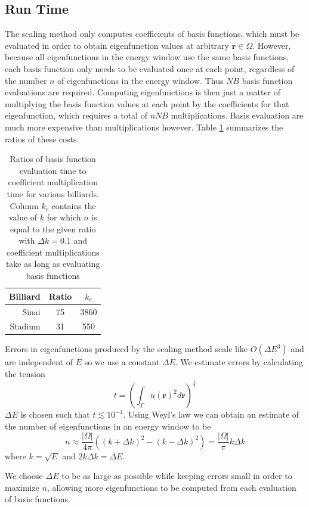 \documentclass{report}
\newcommand{\rr}[0]{\mathbf{r}}
\begin{document}
\subsection{Run Time}
The scaling method only computes coefficients of basis functions, which must be evaluated in order to obtain eigenfunction values at arbitrary $\rr \in \Omega$. However, because all eigenfunctions in the energy window use the same basis functions, each basis function only needs to be evaluated once at each point, regardless of the number $n$ of eigenfunctions in the energy window. Thus $NB$ basis function evaluations are required. Computing eigenfunctions is then just a matter of multiplying the basis function values at each point by the coefficients for that eigenfunction, which requires a total of $nNB$ multiplications. Basis evaluation are much more expensive than multiplications however. Table \ref{tab:eval_ratios} summarizes the ratios of these costs.

\begin{table}
  \centering
  \begin{tabular}{|r|c|c|}
    \hline
    Billiard & Ratio & $k_c$ \\ \hline
    \hline
    Sinai & 75 & 3860 \\ \hline
    Stadium & 31 & 550 \\
    \hline
  \end{tabular}
  \caption{Ratios of basis function evaluation time to coefficient multiplication time for various billiards. Column $k_c$ contains the value of $k$ for which $n$ is equal to the given ratio with $\Delta k = 0.1$ and coefficient multiplications take as long as evaluating basis functions}
  \label{tab:eval_ratios}
\end{table}

Errors in eigenfunctions produced by the scaling method scale like $O({\Delta E}^{3})$ \cite{barnett_hassell} and are independent of $E$ so we use a constant $\Delta E$. We estimate errors by calculating the tension
\[
t = \left( \int_{\Gamma} u(\rr)^{2} d\rr \right)^{\frac{1}{2}}
\]
$\Delta E$ is chosen such that $t \lesssim 10^{-4}$. Using Weyl's law we can obtain an estimate of the number of eigenfunctions in an energy window to be
\[
n \approx \frac{\vert \Omega \vert}{4 \pi} ((k + \Delta k)^{2} - (k - \Delta k)^{2}) = \frac{\vert \Omega \vert}{\pi} k \Delta k
\]
where $k = \sqrt{E}$ and $2 k \Delta k = \Delta E$.

We choose $\Delta E$ to be as large as possible while keeping errors small in order to maximize $n$, allowing more eigenfunctions to be computed from each evaluation of basis functions.
\end{document}
